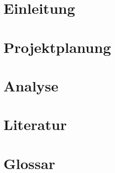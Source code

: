 \documentclass[11pt]{article}
\begin{document}

    
    \newpage
    \tableofcontents
    \newpage
    \section{Einleitung}
    
    \pagebreak
    \section{Projektplanung}
    
    \pagebreak
    \section{Analyse}
    
    \pagebreak

    \clearpage
    \pagestyle{plain} %
    \section{Literatur}
    
    \pagebreak
    \section{Glossar}
    
    \pagebreak
    
\end{document}

